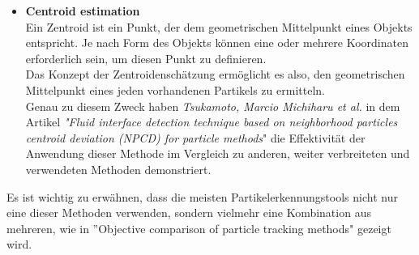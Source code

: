 \begin{itemize}
\item \textbf{Centroid estimation}\\
Ein Zentroid ist ein Punkt, der dem geometrischen Mittelpunkt eines Objekts entspricht. Je nach Form des Objekts können eine oder mehrere Koordinaten erforderlich sein, um diesen Punkt zu definieren.\\
Das Konzept der Zentroidenschätzung ermöglicht es also, den geometrischen Mittelpunkt eines jeden vorhandenen Partikels zu ermitteln.\\ 
Genau zu diesem Zweck haben \textit{Tsukamoto, Marcio Michiharu et al.} in dem Artikel \textit{"Fluid interface detection technique based on neighborhood particles centroid deviation (NPCD) for particle methods}" \cite{tsukamoto2016fluid} die Effektivität der Anwendung dieser Methode im Vergleich zu anderen, weiter verbreiteten und verwendeten Methoden demonstriert.

\end{itemize}

Es ist wichtig zu erwähnen, dass die meisten Partikelerkennungstools nicht nur eine dieser Methoden verwenden, sondern vielmehr eine Kombination aus mehreren, wie in ''Objective comparison of particle tracking methods"   \cite{chenouard2014objective} gezeigt wird. 

